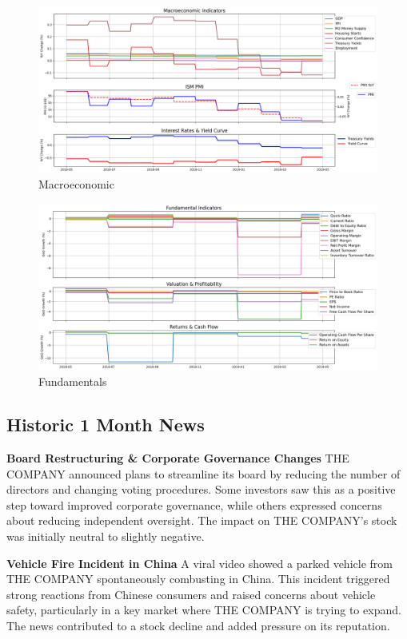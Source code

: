 \documentclass[8pt]{scrartcl}
\begin{document}
\begin{figure}[H]
    \centering
    \includegraphics[width=1\linewidth]{judge_reviews/TSLA_M_gpt-4o-mini/2019-05-01/judge_Macroeconomic_Indicators.png}
    \caption{Macroeconomic}
\end{figure}

\begin{figure}[H]
    \centering
    \includegraphics[width=1\linewidth]{judge_reviews/TSLA_M_gpt-4o-mini/2019-05-01/judge_Fundamental_Indicators.png}
    \caption{Fundamentals}
\end{figure}


\subsection*{Historic 1 Month News}

\textbf{Board Restructuring \& Corporate Governance Changes}
THE COMPANY announced plans to streamline its board by reducing the number of directors and changing voting procedures. Some investors saw this as a positive step toward improved corporate governance, while others expressed concerns about reducing independent oversight. The impact on THE COMPANY's stock was initially neutral to slightly negative.

\textbf{Vehicle Fire Incident in China}
A viral video showed a parked vehicle from THE COMPANY spontaneously combusting in China. This incident triggered strong reactions from Chinese consumers and raised concerns about vehicle safety, particularly in a key market where THE COMPANY is trying to expand. The news contributed to a stock decline and added pressure on its reputation.
\end{document}
